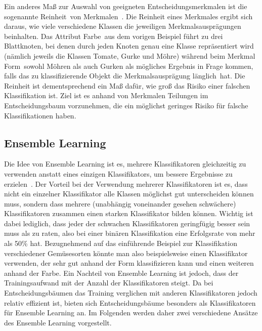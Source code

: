 Ein anderes Maß zur Auswahl von geeigneten Entscheidungsmerkmalen ist die sogenannte \glqq Reinheit\grqq\ von Merkmalen~\cite{Gini}. Die Reinheit eines Merkmales ergibt sich daraus, wie viele verschiedene Klassen die jeweiligen Merkmalsausprägungen beinhalten. Das Attribut \glqq Farbe\grqq\ aus dem vorigen Beispiel führt zu drei Blattknoten, bei denen durch jeden Knoten genau eine Klasse repräsentiert wird (nämlich jeweils die Klassen Tomate, Gurke und Möhre) während beim Merkmal \glqq Form\grqq\ sowohl Möhren als auch Gurken als mögliches Ergebnis in Frage kommen, falls das zu klassifizierende Objekt die Merkmalsausprägung \glqq länglich\grqq\ hat. Die Reinheit ist dementsprechend ein Maß dafür, wie groß das Risiko einer falschen Klassifikation ist. Ziel ist es anhand von Merkmalen Teilungen im Entscheidungsbaum vorzunehmen, die ein möglichst geringes Risiko für falsche Klassifikationen haben.


\subsection{Ensemble Learning}
Die Idee von Ensemble Learning ist es, mehrere Klassifikatoren gleichzeitig zu verwenden anstatt eines einzigen Klassifikators, um bessere Ergebnisse zu erzielen~\cite{Opitz99popularensemble}. Der Vorteil bei der Verwendung mehrerer Klassifikatoren ist es, dass nicht ein einzelner Klassifikator alle Klassen möglichst gut unterscheiden können muss, sondern dass mehrere (unabhängig voneinander gesehen schwächere) Klassifikatoren zusammen einen starken Klassifikator bilden können. Wichtig ist dabei lediglich, dass jeder der schwachen Klassifikatoren geringfügig besser sein muss als zu raten, also bei einer binären Klassifikation eine Erfolgsrate von mehr als 50\% hat.
Bezugnehmend auf das einführende Beispiel zur Klassifikation verschiedener Gemüsesorten könnte man also beispielsweise einen Klassifikator verwenden, der sehr gut anhand der Form klassifizieren kann und einen weiteren anhand der Farbe. Ein Nachteil von Ensemble Learning ist jedoch, dass der Trainingsaufwand mit der Anzahl der Klassifikatoren steigt. Da bei Entscheidungsbäumen das Training verglichen mit anderen Klassifikatoren jedoch relativ effizient ist, bieten sich Entscheidungsbäume besonders als Klassifikatoren für Ensemble Learning an. Im Folgenden werden daher zwei verschiedene Ansätze des Ensemble Learning vorgestellt.


